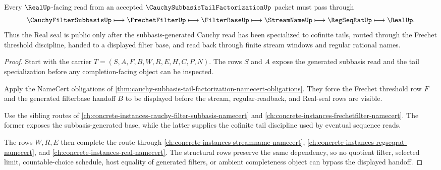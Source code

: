 \begin{theorem}
\label{thm:cauchy-subbasis-tail-factorization-real-handoff}
Every $\RealUp$-facing read from an accepted $\CauchySubbasisTailFactorizationUp$ packet must pass through
$$
\CauchyFilterSubbasisUp \longmapsto \FrechetFilterUp \longmapsto \FilterBaseUp \longmapsto \StreamNameUp \longmapsto \RegSeqRatUp \longmapsto \RealUp .
$$
Thus the Real seal is public only after the subbasis-generated Cauchy read has been specialized to cofinite tails, routed through the Frechet threshold discipline, handed to a displayed filter base, and read back through finite stream windows and regular rational names.
\end{theorem}
\begin{proof}
Start with the carrier $T=(S,A,F,B,W,R,E,H,C,P,N)$. The rows $S$ and $A$ expose the generated subbasis read and the tail specialization before any completion-facing object can be inspected.

Apply the NameCert obligations of \autoref{thm:cauchy-subbasis-tail-factorization-namecert-obligations}. They force the Frechet threshold row $F$ and the generated filterbase handoff $B$ to be displayed before the stream, regular-readback, and Real-seal rows are visible.

Use the sibling routes of \autoref{ch:concrete-instances-cauchy-filter-subbasis-namecert} and \autoref{ch:concrete-instances-frechetfilter-namecert}. The former exposes the subbasis-generated base, while the latter supplies the cofinite tail discipline used by eventual sequence reads.

The rows $W,R,E$ then complete the route through \autoref{ch:concrete-instances-streamname-namecert}, \autoref{ch:concrete-instances-regseqrat-namecert}, and \autoref{ch:concrete-instances-real-namecert}. The structural rows preserve the same dependency, so no quotient filter, selected limit, countable-choice schedule, host equality of generated filters, or ambient completeness object can bypass the displayed handoff.
\end{proof}



